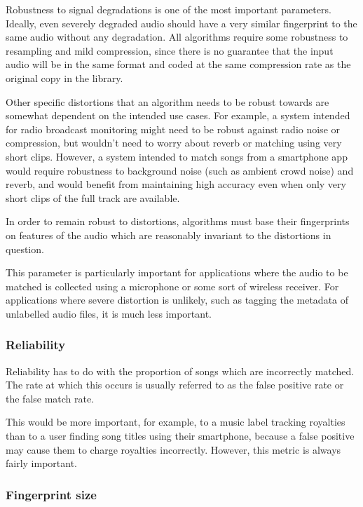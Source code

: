 \documentclass[12pt,a4paper,twoside,openright]{report}
\begin{document}
Robustness to signal degradations is one of the most important parameters. Ideally, even severely degraded audio should have a very similar fingerprint to the same audio without any degradation. All algorithms require some robustness to resampling and mild compression, since there is no guarantee that the input audio will be in the same format and coded at the same compression rate as the original copy in the library.

Other specific distortions that an algorithm needs to be robust towards are somewhat dependent on the intended use cases. For example, a system intended for radio broadcast monitoring might need to be robust against radio noise or compression, but wouldn't need to worry about reverb or matching using very short clips. However, a system intended to match songs from a smartphone app would require robustness to background noise (such as ambient crowd noise) and reverb, and would benefit from maintaining high accuracy even when only very short clips of the full track are available.

In order to remain robust to distortions, algorithms must base their fingerprints on features of the audio which are reasonably invariant to the distortions in question.

This parameter is particularly important for applications where the audio to be matched is collected using a microphone or some sort of wireless receiver. For applications where severe distortion is unlikely, such as tagging the metadata of unlabelled audio files, it is much less important.

\subsubsection{Reliability}

Reliability has to do with the proportion of songs which are incorrectly matched. The rate at which this occurs is usually referred to as the false positive rate or the false match rate.

This would be more important, for example, to a music label tracking royalties than to a user finding song titles using their smartphone, because a false positive may cause them to charge royalties incorrectly. However, this metric is always fairly important.

\subsubsection{Fingerprint size}
\end{document}

